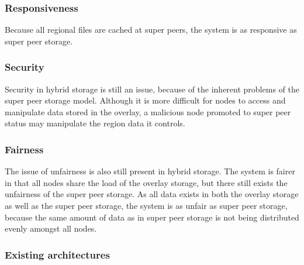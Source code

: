 \documentclass[10pt,a4paper,journal,cspaper,compsoc]{IEEEtran}
\begin{document}
\subsubsection{Responsiveness}

Because all regional files are cached at super peers, the system is as responsive as super peer storage.

\subsubsection{Security}

Security in hybrid storage is still an issue, because of the inherent problems of the super peer storage model. Although it is more difficult for
nodes to access and manipulate data stored in the overlay, a malicious node promoted to super peer status may manipulate the region data it controls.

\subsubsection{Fairness}

The issue of unfairness is also still present in hybrid storage. The system is fairer in that all nodes share the load of the overlay storage, but
there still exists the unfairness of the super peer storage. As all data exists in both the overlay storage as well as the super peer storage, the
system is as unfair as super peer storage, because the same amount of data as in super peer storage is not being distributed evenly amongst all
nodes.

\subsubsection{Existing architectures}
\end{document}
